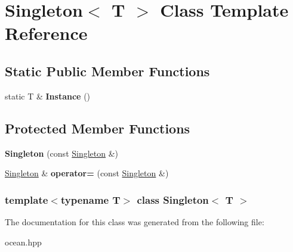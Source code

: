 \hypertarget{classSingleton}{
\section{Singleton$<$ T $>$ Class Template Reference}
\label{classSingleton}
}
\subsection*{Static Public Member Functions}
\begin{DoxyCompactItemize}
\item 
\hypertarget{classSingleton_a131e87528259529400d58b6df5d9743c}{
static T \& {\bfseries Instance} ()}
\label{classSingleton_a131e87528259529400d58b6df5d9743c}

\end{DoxyCompactItemize}
\subsection*{Protected Member Functions}
\begin{DoxyCompactItemize}
\item 
\hypertarget{classSingleton_a363d3f7d5276e6ee74966d9606df2086}{
{\bfseries Singleton} (const \hyperlink{classSingleton}{Singleton} \&)}
\label{classSingleton_a363d3f7d5276e6ee74966d9606df2086}

\item 
\hypertarget{classSingleton_a90761b9486d76162ab59c871b5cc030f}{
\hyperlink{classSingleton}{Singleton} \& {\bfseries operator=} (const \hyperlink{classSingleton}{Singleton} \&)}
\label{classSingleton_a90761b9486d76162ab59c871b5cc030f}

\end{DoxyCompactItemize}
\subsubsection*{template$<$typename T$>$ class Singleton$<$ T $>$}



The documentation for this class was generated from the following file:\begin{DoxyCompactItemize}
\item 
ocean.hpp\end{DoxyCompactItemize}
